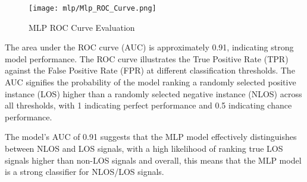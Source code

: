 \begin{figure}[H] 
  \centering
  \texttt{[image: mlp/Mlp\_ROC\_Curve.png]}
  \caption{MLP ROC Curve Evaluation}\label{fig:mpl_roc_curve}
\end{figure}

The area under the ROC curve (AUC) is approximately 0.91, indicating strong model performance. The ROC curve illustrates the True Positive Rate (TPR) against the False Positive Rate (FPR) at different classification thresholds. The AUC signifies the probability of the model ranking a randomly selected positive instance (LOS) higher than a randomly selected negative instance (NLOS) across all thresholds, with 1 indicating perfect performance and 0.5 indicating chance performance.

The model's AUC of 0.91 suggests that the MLP model effectively distinguishes between NLOS and LOS signals, with a high likelihood of ranking true LOS signals higher than non-LOS signals and overall, this means that the MLP model is a strong classifier for NLOS/LOS signals.

